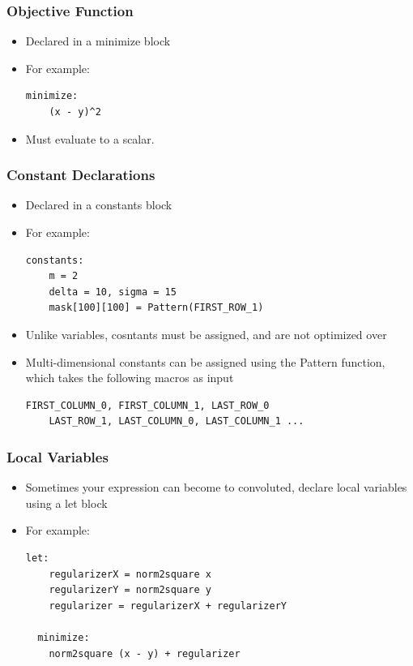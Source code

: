 \documentclass[presentation]{beamer}
\begin{document}
\begin{frame}[fragile]
  \frametitle{Objective Function}

  \begin{itemize}
  \item Declared in a {\color{red} minimize} block
  \item For example:
  \begin{lstlisting}[style=Haskell]
  minimize:
    (x - y)^2
  \end{lstlisting}
  \item Must evaluate to a scalar.
  \end{itemize}
\end{frame}

\begin{frame}[fragile]
  \frametitle{Constant Declarations}

  \begin{itemize}
  \item Declared in a {\color{red} constants} block
  \item For example:
  \begin{lstlisting}[style=Haskell]
  constants:
    m = 2
    delta = 10, sigma = 15
    mask[100][100] = Pattern(FIRST_ROW_1)
  \end{lstlisting}
  \item Unlike variables, cosntants must be assigned, and are not optimized over
  \item Multi-dimensional constants can be assigned using the Pattern function,
    which takes the following macros as input
  \begin{lstlisting}[style=CStyle]
    FIRST_COLUMN_0, FIRST_COLUMN_1, LAST_ROW_0
    LAST_ROW_1, LAST_COLUMN_0, LAST_COLUMN_1 ...
  \end{lstlisting}
  \end{itemize}
\end{frame}

\begin{frame}[fragile]
  \frametitle{Local Variables}

  \begin{itemize}
    \item Sometimes your expression can become to convoluted, declare local
      variables using a {\color{red}let} block
    \item For example:
  \begin{lstlisting}[style=Haskell]
  let:
    regularizerX = norm2square x
    regularizerY = norm2square y
    regularizer = regularizerX + regularizerY

  minimize:
    norm2square (x - y) + regularizer      
  \end{lstlisting}
  \end{itemize}
\end{frame}
\end{document}
